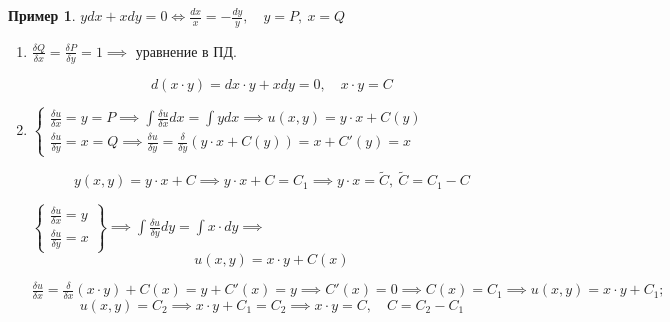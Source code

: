 \documentclass{report}
\theoremstyle{definition}
\newtheorem{example}{Пример}
\begin{document}
\begin{example}
    $ydx + xdy = 0 \iff \frac{dx}{x} = - \frac{dy}{y}, \quad y = P, \ x = Q$

    \begin{enumerate}
        \item $\frac{\delta Q}{\delta x} = \frac{\delta P}{\delta y} = 1 \implies$ уравнение в ПД.

              \begin{equation*}
                  d(x\cdot y) = dx \cdot y + xdy = 0, \quad x \cdot y = C
              \end{equation*}

        \item $\left\{\begin{array}{l}
                      \frac{\delta u}{\delta x} = y = P \implies \int\frac{\delta u}{\delta x}dx = \int ydx \implies u(x,y) = y\cdot x + C(y) \\
                      \frac{\delta u}{\delta y} = x = Q \implies \frac{\delta u}{\delta y} = \frac{\delta}{\delta y}(y\cdot x + C(y)) = x + C'(y) = x
                  \end{array}\right.$

              \begin{equation*}
                  y(x,y) = y\cdot x + C \implies y \cdot x + C = C_1 \implies y \cdot x = \widetilde{C}, \ \widetilde{C} = C_1 - C
              \end{equation*}

              $\left\{\begin{array}{l}
                      \frac{\delta u}{\delta x} = y \\
                      \frac{\delta u}{\delta y} = x
                  \end{array}\right\} \implies \int \frac{\delta u}{\delta y}dy = \int x \cdot dy \implies$
              \begin{equation*}
                  u(x,y) = x\cdot y + C(x)
              \end{equation*}

              $\frac{\delta u}{\delta x} = \frac{\delta}{\delta x}(x\cdot y) + C(x) = y + C'(x) = y \implies C'(x) = 0 \implies C(x) = C_1 \implies u(x,y) = x\cdot y + C_1;$
              \begin{equation*}
                  u(x,y) = C_2 \implies x\cdot y + C_1 = C_2 \implies x\cdot y = C, \quad C = C_2 - C_1
              \end{equation*}
    \end{enumerate}
\end{example}
\end{document}
